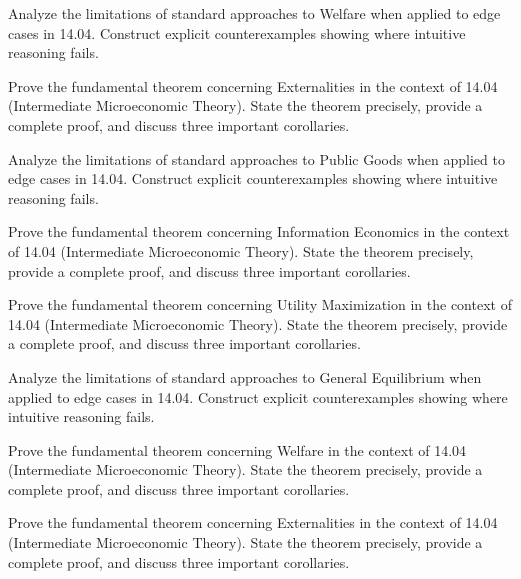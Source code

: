 \documentclass[12pt,a4paper]{exam}
\begin{document}
\begin{questions}
\vspace{0.3cm}

\question[5]
Analyze the limitations of standard approaches to Welfare when applied to edge cases in 14.04. Construct explicit counterexamples showing where intuitive reasoning fails.

\vspace{0.3cm}

\question[6]
Prove the fundamental theorem concerning Externalities in the context of 14.04 (Intermediate Microeconomic Theory). State the theorem precisely, provide a complete proof, and discuss three important corollaries.

\vspace{0.3cm}

\question[4]
Analyze the limitations of standard approaches to Public Goods when applied to edge cases in 14.04. Construct explicit counterexamples showing where intuitive reasoning fails.

\vspace{0.3cm}

\question[5]
Prove the fundamental theorem concerning Information Economics in the context of 14.04 (Intermediate Microeconomic Theory). State the theorem precisely, provide a complete proof, and discuss three important corollaries.

\vspace{0.3cm}

\question[5]
Prove the fundamental theorem concerning Utility Maximization in the context of 14.04 (Intermediate Microeconomic Theory). State the theorem precisely, provide a complete proof, and discuss three important corollaries.

\vspace{0.3cm}

\question[2]
Analyze the limitations of standard approaches to General Equilibrium when applied to edge cases in 14.04. Construct explicit counterexamples showing where intuitive reasoning fails.

\vspace{0.3cm}

\question[4]
Prove the fundamental theorem concerning Welfare in the context of 14.04 (Intermediate Microeconomic Theory). State the theorem precisely, provide a complete proof, and discuss three important corollaries.

\vspace{0.3cm}

\question[3]
Prove the fundamental theorem concerning Externalities in the context of 14.04 (Intermediate Microeconomic Theory). State the theorem precisely, provide a complete proof, and discuss three important corollaries.


\end{questions}
\end{document}
